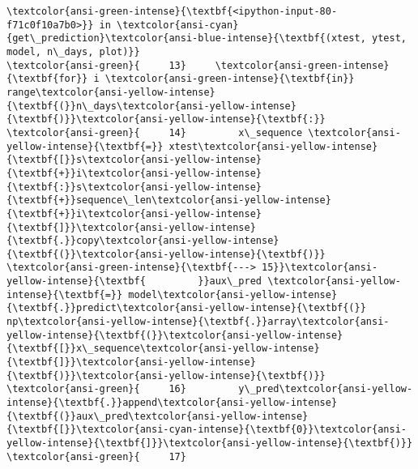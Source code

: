 \documentclass[11pt]{article}
\begin{document}
\begin{Verbatim}[commandchars=\\\{\}, frame=single, framerule=2mm, rulecolor=\color{outerrorbackground}]
\textcolor{ansi-green-intense}{\textbf{<ipython-input-80-f71c0f10a7b0>}} in \textcolor{ansi-cyan}{get\_prediction}\textcolor{ansi-blue-intense}{\textbf{(xtest, ytest, model, n\_days, plot)}}
\textcolor{ansi-green}{     13}     \textcolor{ansi-green-intense}{\textbf{for}} i \textcolor{ansi-green-intense}{\textbf{in}} range\textcolor{ansi-yellow-intense}{\textbf{(}}n\_days\textcolor{ansi-yellow-intense}{\textbf{)}}\textcolor{ansi-yellow-intense}{\textbf{:}}
\textcolor{ansi-green}{     14}         x\_sequence \textcolor{ansi-yellow-intense}{\textbf{=}} xtest\textcolor{ansi-yellow-intense}{\textbf{[}}s\textcolor{ansi-yellow-intense}{\textbf{+}}i\textcolor{ansi-yellow-intense}{\textbf{:}}s\textcolor{ansi-yellow-intense}{\textbf{+}}sequence\_len\textcolor{ansi-yellow-intense}{\textbf{+}}i\textcolor{ansi-yellow-intense}{\textbf{]}}\textcolor{ansi-yellow-intense}{\textbf{.}}copy\textcolor{ansi-yellow-intense}{\textbf{(}}\textcolor{ansi-yellow-intense}{\textbf{)}}
\textcolor{ansi-green-intense}{\textbf{---> 15}}\textcolor{ansi-yellow-intense}{\textbf{         }}aux\_pred \textcolor{ansi-yellow-intense}{\textbf{=}} model\textcolor{ansi-yellow-intense}{\textbf{.}}predict\textcolor{ansi-yellow-intense}{\textbf{(}} np\textcolor{ansi-yellow-intense}{\textbf{.}}array\textcolor{ansi-yellow-intense}{\textbf{(}}\textcolor{ansi-yellow-intense}{\textbf{[}}x\_sequence\textcolor{ansi-yellow-intense}{\textbf{]}}\textcolor{ansi-yellow-intense}{\textbf{)}}\textcolor{ansi-yellow-intense}{\textbf{)}}
\textcolor{ansi-green}{     16}         y\_pred\textcolor{ansi-yellow-intense}{\textbf{.}}append\textcolor{ansi-yellow-intense}{\textbf{(}}aux\_pred\textcolor{ansi-yellow-intense}{\textbf{[}}\textcolor{ansi-cyan-intense}{\textbf{0}}\textcolor{ansi-yellow-intense}{\textbf{]}}\textcolor{ansi-yellow-intense}{\textbf{)}}
\textcolor{ansi-green}{     17} 


\end{Verbatim}
\end{document}
